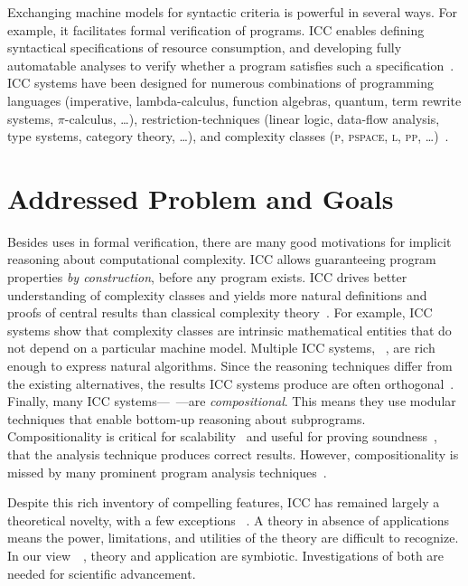 Exchanging machine models for syntactic criteria is powerful in several ways.
For example, it facilitates formal verification of programs. ICC enables
defining {syntactical} specifications of resource consumption, and developing
fully automatable analyses to verify whether a program satisfies such a
specification~\cite{heraud2011}. ICC systems have been designed for numerous
combinations of programming languages (imperative,  lambda-calculus, function
algebras, quantum, term rewrite systems, \(\pi\)-calculus, \ldots),
restriction-techniques (linear logic, data-flow analysis, type systems, category
theory, \ldots), and complexity classes (\textsc{p}, \textsc{pspace},
\textsc{l}, \textsc{pp}, \ldots)~\cite{moyen2017,pchoux2020}.

\section{Addressed Problem and Goals}
\label{sec:aicc-goals}

Besides uses in formal verification, there are many good motivations for
implicit reasoning about computational complexity. ICC allows guaranteeing
program properties \emph{by construction}, before any program exists. ICC drives
better understanding of complexity classes and yields more natural definitions
and proofs of central results than classical complexity
theory~\cite{kristiansen2017}. For example, ICC systems show that complexity
classes are intrinsic mathematical entities that do not depend on a particular
machine model. Multiple ICC systems, \eg~\cite{jones2009,marion2011}, are rich
enough to express natural algorithms. Since the reasoning techniques differ from
the existing alternatives, the results ICC systems produce are often
orthogonal~\cite{aubert20222}. Finally, many ICC
systems---\eg~\cite{jones2009,marion2011,hainry2023,atkey2024}---are
\emph{compositional}. This means they use modular techniques that enable
bottom-up reasoning about subprograms. Compositionality is critical for
scalability~\cite{carbonneaux2015} and useful for proving
soundness~\cite{keidel2021}, \ie that the analysis technique produces correct
results. However, compositionality is missed by many prominent program analysis
techniques~\cite{carbonneaux2015,schiebel2024}.

Despite this rich inventory of compelling features, ICC has remained largely a
theoretical novelty, with a few exceptions%
~\cite{avanzini2017,avanzini2008,moyen20172,hainry2021,hoffmann2012,feree2018}.
A theory in absence of applications means the power, limitations, and utilities
of the theory are difficult to recognize. In our view~\cite[p.
xxxv]{bishop2003}~\cite[p. 75]{moyen2017}, theory and application are
{symbiotic}. Investigations of both are needed for scientific advancement.

